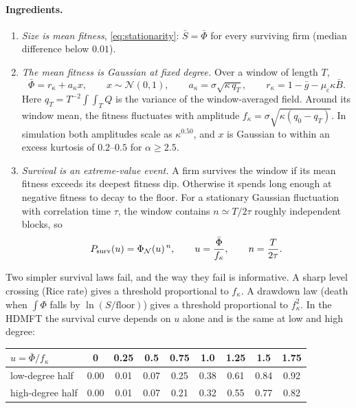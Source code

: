 \documentclass[11pt]{article}
\newcommand{\mc}{\mu_{\mathrm c}}
\theoremstyle{remark}
\begin{document}
\paragraph{Ingredients.}
\begin{enumerate}
  \item \emph{Size is mean fitness}, \eqref{eq:stationarity}: $\bar S=\bar\Phi$ for every
        surviving firm (median difference below $0.01$).
  \item \emph{The mean fitness is Gaussian at fixed degree.}  Over a window of length $T$,
        \begin{equation}
          \bar\Phi=r_\kappa+a_\kappa x,\qquad x\sim\mathcal N(0,1),\qquad
          a_\kappa=\sigma\sqrt{\kappa\,q_T},\qquad r_\kappa=1-\bar g-\mc\kappa\bar B .
        \end{equation}
        Here $q_T=T^{-2}\!\int\!\!\int_TQ$ is the variance of the window-averaged field.  Around
        its window mean, the fitness fluctuates with amplitude $f_\kappa=\sigma\sqrt{\kappa(q_0-q_T)}$.
        In simulation both amplitudes scale as $\kappa^{0.50}$, and $x$ is Gaussian to within an
        excess kurtosis of $0.2$--$0.5$ for $\alpha\ge2.5$.
  \item \emph{Survival is an extreme-value event.}  A firm survives the window if its mean
        fitness exceeds its deepest fitness dip.  Otherwise it spends long enough at negative
        fitness to decay to the floor.  For a stationary Gaussian fluctuation with correlation
        time $\tau$, the window contains $n\simeq T/2\tau$ roughly independent blocks, so
        \begin{equation}
          P_{\rm surv}(u)=\Phi_{\mathcal N}(u)^{\,n},\qquad u=\frac{\bar\Phi}{f_\kappa},
          \qquad n=\frac{T}{2\tau}.
          \label{eq:ev}
        \end{equation}
\end{enumerate}

Two simpler survival laws fail, and the way they fail is informative.  A sharp level crossing
(Rice rate) gives a threshold proportional to $f_\kappa$.  A drawdown law (death when $\int\Phi$
falls by $\ln(S/\text{floor})$) gives a threshold proportional to $f_\kappa^2$.  In the HDMFT the
survival curve depends on $u$ alone and is the same at low and high degree:

\begin{center}
\small
\begin{tabular}{lcccccccc}
\toprule
$u=\bar\Phi/f_\kappa$ & 0 & 0.25 & 0.5 & 0.75 & 1.0 & 1.25 & 1.5 & 1.75\\
\midrule
low-degree half  & 0.00 & 0.01 & 0.07 & 0.25 & 0.38 & 0.61 & 0.84 & 0.92\\
high-degree half & 0.00 & 0.01 & 0.07 & 0.21 & 0.32 & 0.55 & 0.77 & 0.82\\
\bottomrule
\end{tabular}
\end{center}
\end{document}
